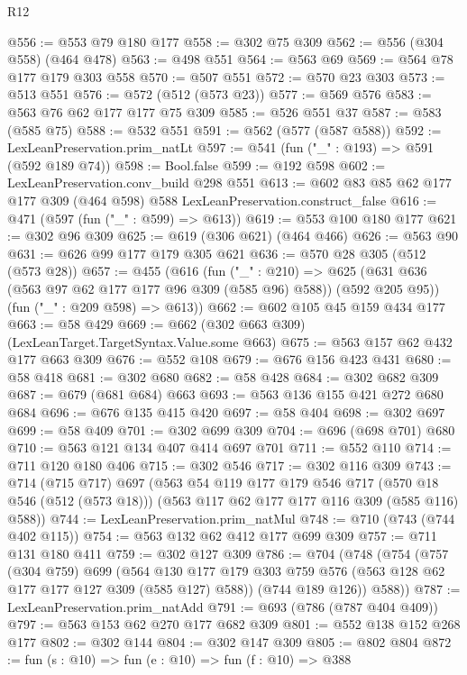 \begin{lexlean}{R12}
\begin{coremodule}
@556 := @553 @79 @180 @177
@558 := @302 @75 @309
@562 := @556 (@304 @558) (@464 @478)
@563 := @498 @551
@564 := @563 @69
@569 := @564 @78 @177 @179 @303 @558
@570 := @507 @551
@572 := @570 @23 @303
@573 := @513 @551
@576 := @572 (@512 (@573 @23))
@577 := @569 @576
@583 := @563 @76 @62 @177 @177 @75 @309
@585 := @526 @551 @37
@587 := @583 (@585 @75)
@588 := @532 @551
@591 := @562 (@577 (@587 @588))
@592 := LexLeanPreservation.prim_natLt
@597 := @541 (fun ("_" : @193) => @591 (@592 @189 @74))
@598 := Bool.false
@599 := @192 @598
@602 := LexLeanPreservation.conv_build @298 @551
@613 := @602 @83 @85 @62 @177 @177 @309 (@464 @598) @588 LexLeanPreservation.construct_false
@616 := @471 (@597 (fun ("_" : @599) => @613))
@619 := @553 @100 @180 @177
@621 := @302 @96 @309
@625 := @619 (@306 @621) (@464 @466)
@626 := @563 @90
@631 := @626 @99 @177 @179 @305 @621
@636 := @570 @28 @305 (@512 (@573 @28))
@657 := @455
    (@616
      (fun ("_" : @210) =>
      @625 (@631 @636 (@563 @97 @62 @177 @177 @96 @309 (@585 @96) @588)) (@592 @205 @95))
      (fun ("_" : @209 @598) => @613))
@662 := @602 @105 @45 @159 @434 @177
@663 := @58 @429
@669 := @662 (@302 @663 @309) (LexLeanTarget.TargetSyntax.Value.some @663)
@675 := @563 @157 @62 @432 @177 @663 @309
@676 := @552 @108
@679 := @676 @156 @423 @431
@680 := @58 @418
@681 := @302 @680
@682 := @58 @428
@684 := @302 @682 @309
@687 := @679 (@681 @684) @663
@693 := @563 @136 @155 @421 @272 @680 @684
@696 := @676 @135 @415 @420
@697 := @58 @404
@698 := @302 @697
@699 := @58 @409
@701 := @302 @699 @309
@704 := @696 (@698 @701) @680
@710 := @563 @121 @134 @407 @414 @697 @701
@711 := @552 @110
@714 := @711 @120 @180 @406
@715 := @302 @546
@717 := @302 @116 @309
@743 := @714
    (@715 @717)
    @697
    (@563
      @54
      @119
      @177
      @179
      @546
      @717
      (@570 @18 @546 (@512 (@573 @18)))
      (@563 @117 @62 @177 @177 @116 @309 (@585 @116) @588))
@744 := LexLeanPreservation.prim_natMul
@748 := @710 (@743 (@744 @402 @115))
@754 := @563 @132 @62 @412 @177 @699 @309
@757 := @711 @131 @180 @411
@759 := @302 @127 @309
@786 := @704
    (@748
      (@754
        (@757
          (@304 @759)
          @699
          (@564 @130 @177 @179 @303 @759 @576 (@563 @128 @62 @177 @177 @127 @309 (@585 @127) @588))
          (@744 @189 @126))
        @588))
@787 := LexLeanPreservation.prim_natAdd
@791 := @693 (@786 (@787 @404 @409))
@797 := @563 @153 @62 @270 @177 @682 @309
@801 := @552 @138 @152 @268 @177
@802 := @302 @144
@804 := @302 @147 @309
@805 := @802 @804
@872 := fun (s : @10) =>
  fun (e : @10) =>
  fun (f : @10) =>
  @388

\end{coremodule}
\end{lexlean}
